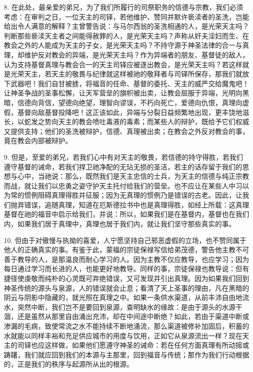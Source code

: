8. 在此处，最亲爱的弟兄，为了我们所履行的司祭职务的信德与宗教，我们必须考虑：在审判之日，一位天主的司铎，若他维护、赞同并默许亵渎者的圣洗，岂能给出令人满意的解释？主曾警告说：与马尔西翁的圣洗相通的人，是光荣天主吗？判断那些亵渎天主者之间能得赦罪的人，是光荣天主吗？声称从奸夫淫妇而生、在教会之外的人能成为天主的子女，是光荣天主吗？不持守源于神圣法律的合一与真理，却维护反对教会的异端，是光荣天主吗？作为异端者的朋友、基督徒的敌人，认为支持基督真理与教会合一的天主司铎应被逐出教会，是光荣天主吗？若这样就是光荣天主，若天主的敬畏与纪律就这样被祂的敬拜者与司铎所保存，那我们就放下武器吧！我们自甘被掳，将福音的任命、基督的委托、天主的威严交给魔鬼吧！让神圣争战的圣事松懈，让天军营垒的旗帜被出卖，让教会屈服于异端，光明向黑暗，信德向背信，望德向绝望，理智向谬误，不朽向死亡，爱德向仇恨，真理向虚假，基督向敌基督投降吧！这正该如此，异端与分裂日益频繁地出现，更丰饶地滋长，以蛇发之势向天主的教会喷吐毒液的毒素；而某些人的辩护，既给予它们权威又提供支持；他们的圣洗被辩护，信德、真理被出卖；在教会之外反对教会的事，竟在教会内部被辩护。\par

9. 但是，至爱的弟兄，若我们心中有对天主的敬畏，若信德的持守得胜，若我们遵守基督的诫命，若我们捍卫祂净配的无玷无损的圣洁，若主的话存留于我们的思想与心中，当祂说：那么，既然我们是天主忠信的士兵，为天主的信德与纯正宗教而战，就让我们以忠勇之姿守护天主托付给我们的营垒。也不应让在某些人中习以为常的惯例阻碍真理得胜并征服；因为无真理的惯例乃是错误的古老。因此，让我们抛弃错误，追随真理，知道在厄斯德拉书中也是真理得胜，如经上所载：这真理基督在祂的福音中启示给我们，并说：所以，如果我们是在基督内，基督也在我们内，如果我们居于真理中，真理也居于我们内，就让我们坚守那些真实的事。\par

10. 但由于对傲慢与执拗的喜爱，人宁愿坚持自己邪恶虚假的立场，也不赞同属于他人的正确真实的事。有鉴于此，蒙福的宗徒保禄写信给弟茂德，警告他主教不可善于教导的人，是那温良而耐心学习的人。因为主教不仅应教导，也应学习；因为每日通过学习而长进的人，也能更好地教导。同样的事，宗徒保禄也教导说：但有捷径使虔敬而纯朴的心灵既可弃绝错误，又可发现并引出真理。因为如果我们回到神圣传统的源头与泉源，人的错误就会止息；看清了天上圣事的理由，凡在黑暗的阴云与阴影中隐藏的，就光照在真理之中。如果一条供水渠道，从前丰沛自由地流水，突然中断，我们岂不是要回到泉源，查明缺水的缘故：是由于源头的水源干涸，还是虽然从那里自由涌出充沛，却在中间途中断绝？如此，若由于渠道中断或渗漏的毛病，致使常流之水不能持续不断地涌流，那么渠道被修补加固后，积蓄的水就能以同样丰裕和充足供应城市的用度与饮用，正如它从泉源流出一样？现在天主的司铎也应这样做，如果他们愿遵守神圣的诫命：若在任何方面真理有所动摇或踌躇，我们就应回到我们的本源与主那里，回到福音与传统；那作为我们行动根据的，正是我们的秩序与起源所从出的根源。\par

